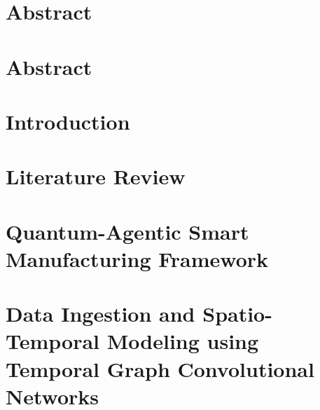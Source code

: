 \documentclass[11pt]{report}
\begin{document}

\thispagestyle{empty}


\newpage


\newpage


\newpage


\newpage
\chapter*{Abstract}


\newpage
\chapter*{Abstract}


\clearpage
{}
\setcounter{page}{1}

\chapter{Introduction}


\renewcommand{\thechapter}{\Roman{chapter}}
\renewcommand{\thesection}{\arabic{chapter}.\arabic{section}}
\chapter{Literature Review}

\renewcommand{\thechapter}{\arabic{chapter}}
\renewcommand{\thesection}{\thechapter.\arabic{section}}

\chapter{Quantum-Agentic Smart Manufacturing Framework}


\chapter{Data Ingestion and Spatio-Temporal Modeling using Temporal Graph Convolutional Networks}
\label{chap:tgcn}

\end{document}
